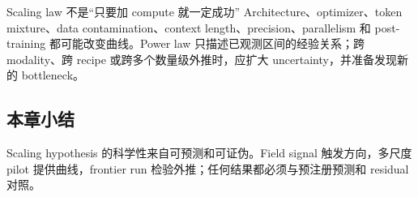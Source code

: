 \begin{warningbox}{Scaling law 不是“只要加 compute 就一定成功”}
Architecture、optimizer、token mixture、data contamination、context length、precision、parallelism 和 post-training 都可能改变曲线。Power law 只描述已观测区间的经验关系；跨 modality、跨 recipe 或跨多个数量级外推时，应扩大 uncertainty，并准备发现新的 bottleneck。
\end{warningbox}

\subsection{本章小结}

Scaling hypothesis 的科学性来自可预测和可证伪。Field signal 触发方向，多尺度 pilot 提供曲线，frontier run 检验外推；任何结果都必须与预注册预测和 residual 对照。


